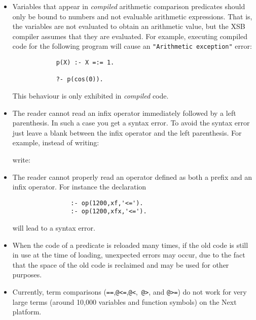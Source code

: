 \begin{itemize}
\item Variables that appear in {\em compiled} arithmetic comparison
      predicates should only be bound to numbers and not evaluable
      arithmetic expressions.  That is, the variables are not evaluated
      to obtain an arithmetic value, but the XSB compiler assumes
      that they are evaluated.  For example, executing compiled code for
      the following program will cause an {\tt "Arithmetic exception"}
      error:
      \begin{verbatim}
            p(X) :- X =:= 1.

            ?- p(cos(0)).
      \end{verbatim}
      This behaviour is only exhibited in {\em compiled} code.
\item The reader cannot read an infix operator immediately followed 
       by a left parenthesis.  In such a case you get a
      syntax error.  To avoid the syntax error just leave a blank between the
      infix operator and the left parenthesis.  For example, instead of 
      writing:


      \noindent
      write:

%
\item The reader cannot properly read an operator defined as both a
prefix and an infix operator.  For instance the declaration 
\begin{verbatim}
                :- op(1200,xf,'<=').
                :- op(1200,xfx,'<=').
\end{verbatim}
will lead to a syntax error.
%
\item When the code of a predicate is reloaded many times, if the old 
      code is still in use at the time of loading, unexpected errors may 
      occur, due to the fact that the space of the old code is reclaimed
      and may be used for other purposes.
\item Currently, term comparisons ({\tt ==},{\tt @<=},{\tt @<},{\tt
      @>}, and {\tt @>=}) do not work for very large terms (around
      10,000 variables and function symbols) on the Next platform.
\end{itemize}

